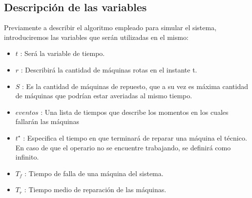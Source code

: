 \documentclass[10pt,a4paper]{article} %
\begin{document}
                                                                                                \subsection{Descripci\'on de las variables}
                                                                                                    Previamente a describir el algoritmo empleado para simular el sistema, introduciremos las variables que ser\'an utilizadas en el mismo:
                                                                                                        \begin{itemize}
                                                                                                            \item $t$ : Ser\'a la variable de tiempo.
                                                                                                                \item $r$ : Describir\'a la cantidad de m\'aquinas rotas en el instante t.
                                                                                                                    \item $S$ : Es la cantidad de m\'aquinas de repuesto, que a su vez es m\'axima cantidad de m\'aquinas que podr\'ian estar averiadas al mismo tiempo.
                                                                                                                        \item $eventos$ : Una lista de tiempos que describe los momentos en los cuales fallar\'an las m\'aquinas
                                                                                                                            \item $t^{\star}$ : Especifica el tiempo en que terminar\'a de reparar una m\'aquina el t\'ecnico. En caso de que el operario no se encuentre trabajando, se definir\'a como infinito.
                                                                                                                                \item $T_f$ : Tiempo de falla de una m\'aquina del sistema.
                                                                                                                                    \item $T_r$ : Tiempo medio de reparaci\'on de las m\'aquinas.
                                                                                                                                        \end{itemize}
\end{document}
